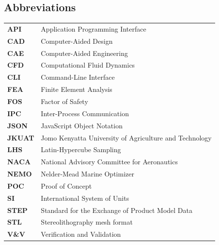 \documentclass[12pt,a4paper]{report}
\begin{document}
\subsection*{Abbreviations}
\begin{longtable}{p{}p{}}
\textbf{API} & Application Programming Interface\\
\textbf{CAD} & Computer-Aided Design\\
\textbf{CAE} & Computer-Aided Engineering\\
\textbf{CFD} & Computational Fluid Dynamics\\
\textbf{CLI} & Command-Line Interface\\
\textbf{FEA} & Finite Element Analysis\\
\textbf{FOS} & Factor of Safety\\
\textbf{IPC} & Inter-Process Communication\\
\textbf{JSON} & JavaScript Object Notation\\
\textbf{JKUAT} & Jomo Kenyatta University of Agriculture and Technology\\
\textbf{LHS} & Latin-Hypercube Sampling\\
\textbf{NACA} & National Advisory Committee for Aeronautics\\
\textbf{NEMO} & Nelder-Mead Marine Optimizer\\
\textbf{POC} & Proof of Concept\\
\textbf{SI} & International System of Units\\
\textbf{STEP} & Standard for the Exchange of Product Model Data\\
\textbf{STL} & Stereolithography mesh format\\
\textbf{V\&V} & Verification and Validation\\
\end{longtable}
\end{document}
